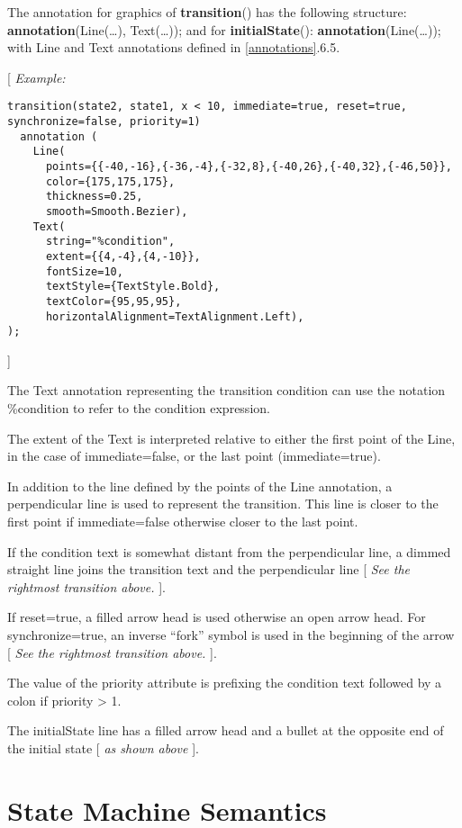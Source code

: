 The annotation for graphics of \textbf{transition}() has the following
structure: \textbf{annotation}(Line(\ldots{}), Text(\ldots{})); and for
\textbf{initialState}(): \textbf{annotation}(Line(\ldots{})); with Line
and Text annotations defined in \ref{annotations}.6.5.

{[} \emph{Example:}
\begin{lstlisting}[language=modelica]
transition(state2, state1, x < 10, immediate=true, reset=true, synchronize=false, priority=1)
  annotation (
    Line(
      points={{-40,-16},{-36,-4},{-32,8},{-40,26},{-40,32},{-46,50}},
      color={175,175,175},
      thickness=0.25,
      smooth=Smooth.Bezier),
    Text(
      string="%condition",
      extent={{4,-4},{4,-10}},
      fontSize=10,
      textStyle={TextStyle.Bold},
      textColor={95,95,95},
      horizontalAlignment=TextAlignment.Left),
);
\end{lstlisting}
{]}

The Text annotation representing the transition condition can use the
notation \%condition to refer to the condition expression.

The extent of the Text is interpreted relative to either the first point
of the Line, in the case of immediate=false, or the last point
(immediate=true).

In addition to the line defined by the points of the Line annotation, a
perpendicular line is used to represent the transition. This line is
closer to the first point if immediate=false otherwise closer to the
last point.

If the condition text is somewhat distant from the perpendicular line, a
dimmed straight line joins the transition text and the perpendicular
line {[} \emph{See the rightmost transition above.} {]}.

If reset=true, a filled arrow head is used otherwise an open arrow head.
For synchronize=true, an inverse ``fork'' symbol is used in the
beginning of the arrow {[} \emph{See the rightmost transition above.}
{]}.

The value of the priority attribute is prefixing the condition text
followed by a colon if priority \textgreater{} 1.

The initialState line has a filled arrow head and a bullet at the
opposite end of the initial state {[} \emph{as shown above} {]}.

\section{State Machine Semantics}

